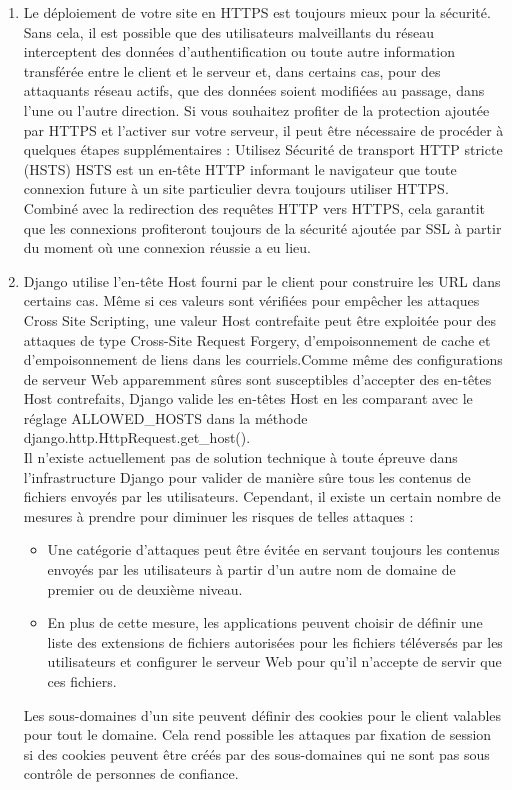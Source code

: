 \documentclass[11pt,a4paper]{article}
\begin{document}
\begin{enumerate}
	\item Le déploiement de votre site en HTTPS est toujours mieux pour la sécurité. Sans cela, il est possible que des utilisateurs malveillants du réseau interceptent des données d’authentification ou toute autre information transférée entre le client et le serveur et, dans certains cas, pour des attaquants réseau actifs, que des données soient modifiées au passage, dans l’une ou l’autre direction.
Si vous souhaitez profiter de la protection ajoutée par HTTPS et l’activer sur votre serveur, il peut être nécessaire de procéder à quelques étapes supplémentaires :
    Utilisez Sécurité de transport HTTP stricte (HSTS)
    HSTS est un en-tête HTTP informant le navigateur que toute connexion future à un site particulier devra toujours utiliser HTTPS. Combiné avec la redirection des requêtes HTTP vers HTTPS, cela garantit que les connexions profiteront toujours de la sécurité ajoutée par SSL à partir du moment où une connexion réussie a eu lieu. 
    \item Django utilise l’en-tête Host fourni par le client pour construire les URL dans certains cas. Même si ces valeurs sont vérifiées pour empêcher les attaques Cross Site Scripting, une valeur Host contrefaite peut être exploitée pour des attaques de type Cross-Site Request Forgery, d’empoisonnement de cache et d’empoisonnement de liens dans les courriels.Comme même des configurations de serveur Web apparemment sûres sont susceptibles d’accepter des en-têtes Host contrefaits, Django valide les en-têtes Host en les comparant avec le réglage ALLOWED\_HOSTS dans la méthode django.http.HttpRequest.get\_host().\\
    Il n’existe actuellement pas de solution technique à toute épreuve dans l’infrastructure Django pour valider de manière sûre tous les contenus de fichiers envoyés par les utilisateurs. Cependant, il existe un certain nombre de mesures à prendre pour diminuer les risques de telles attaques :
    \begin{itemize}
    	\item Une catégorie d’attaques peut être évitée en servant toujours les contenus envoyés par les utilisateurs à partir d’un autre nom de domaine de premier ou de deuxième niveau.
    	\item En plus de cette mesure, les applications peuvent choisir de définir une liste des extensions de fichiers autorisées pour les fichiers téléversés par les utilisateurs et configurer le serveur Web pour qu’il n’accepte de servir que ces fichiers.
    \end{itemize}
    Les sous-domaines d’un site peuvent définir des cookies pour le client valables pour tout le domaine. Cela rend possible les attaques par fixation de session si des cookies peuvent être créés par des sous-domaines qui ne sont pas sous contrôle de personnes de confiance.


\end{enumerate}
\end{document}
